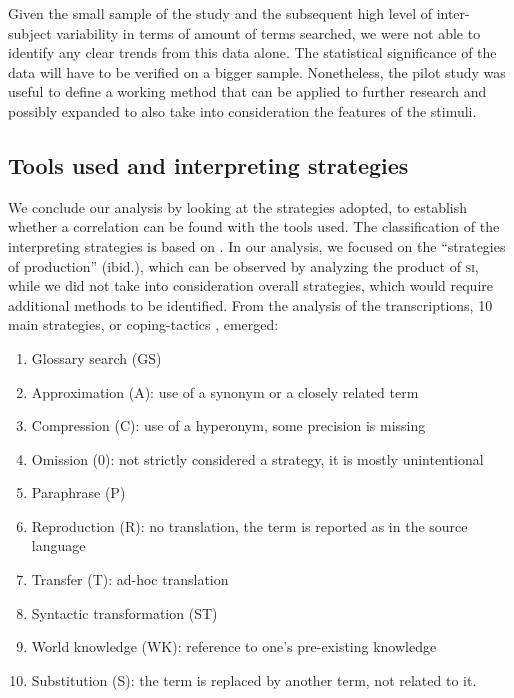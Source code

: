 \documentclass[output=paper]{langsci/langscibook}
\begin{document}
Given the small sample of the study and the subsequent high level of inter-subject variability in terms of amount of terms searched, we were not able to identify any clear trends from this data alone. The statistical significance of the data will have to be verified on a bigger sample. Nonetheless, the pilot study was useful to define a working method that can be applied to further research and possibly expanded to also take into consideration the features of the stimuli. 

\subsection{Tools used and interpreting strategies}\label{sec:prandi:5.3}
We conclude our analysis by looking at the strategies adopted, to establish wheth\-er a correlation can be found with the tools used. The classification of the interpreting strategies is based on \citet{Bartlomiejczyk2006}. In our analysis, we focused on the ``strategies of production'' (ibid.), which can be observed by analyzing the product of \textsc{si}, while we did not take into consideration overall strategies, which would require additional methods to be identified. From the analysis of the transcriptions, 10 main strategies, or coping-tactics \citep{Gile1995}, emerged:

\begin{enumerate}
\item Glossary search (\textsc{GS})
\item Approximation (\textsc{A}): use of a synonym or a closely related term
\item Compression (\textsc{C}): use of a hyperonym, some precision is missing
\item Omission (\textsc{0}): not strictly considered a strategy, it is mostly unintentional
\item Paraphrase (\textsc{P})
\item Reproduction (\textsc{R}): no translation, the term is reported as in the source language
\item Transfer (\textsc{T}): ad-hoc translation
\item Syntactic transformation (\textsc{ST})
\item World knowledge (\textsc{WK}): reference to one’s pre-existing knowledge
\item Substitution (\textsc{S}): the term is replaced by another term, not related to it.
\end{enumerate}
\end{document}
